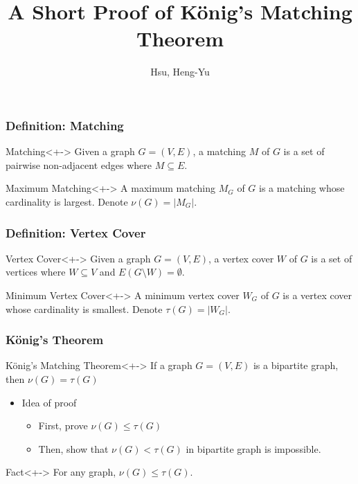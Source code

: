 \documentclass{beamer}
\begin{document}
\title{A Short Proof of K\"{o}nig's Matching Theorem}
\author{Hsu, Heng-Yu}

\begin{frame}
  \titlepage
\end{frame}

\begin{frame}
  \frametitle{Definition: Matching}
  \begin{alertblock}{Matching}<+->
    Given a graph $G=(V,E)$, a \alert{matching} $M$ of $G$ is a set of pairwise non-adjacent edges where $M\subseteq{E}$.
  \end{alertblock}
  \begin{block}{Maximum Matching}<+->
    A \alert{maximum matching} $M_G$ of $G$ is a matching whose cardinality is largest. Denote $\nu{(G)}=|M_G|$.
  \end{block}
\end{frame}

\begin{frame}
  \frametitle{Definition: Vertex Cover}
  \begin{alertblock}{Vertex Cover}<+->
    Given a graph $G=(V,E)$, a \alert{vertex cover} $W$ of $G$ is a set of vertices where $W\subseteq{V}$ and $E(G\setminus{W})=\emptyset$.
  \end{alertblock}
  \begin{block}{Minimum Vertex Cover}<+->
    A \alert{minimum vertex cover} $W_G$ of $G$ is a vertex cover whose cardinality is smallest. Denote $\tau{(G)}=|W_G|$.
  \end{block}
\end{frame}

\begin{frame}
  \frametitle{K\"{o}nig's Theorem}
  \begin{exampleblock}{K\"{o}nig's Matching Theorem}<+->
    If a graph $G=(V,E)$ is a bipartite graph, then $\nu{(G)}=\tau{(G)}$
  \end{exampleblock}
  \begin{itemize}[<+->]
  \item Idea of proof
    \begin{itemize}
    \item First, prove $\nu{(G)}\leq{\tau{(G)}}$
    \item Then, show that $\nu{(G)}<\tau{(G)}$ in bipartite graph is impossible.
    \end{itemize}
  \end{itemize}
  \begin{block}{Fact}<+->
    For any graph, $\nu{(G)}\leq{\tau{(G)}}$.
  \end{block}
\end{frame}
\end{document}
